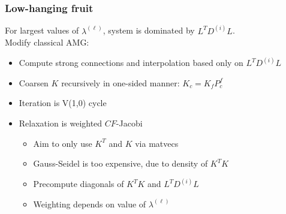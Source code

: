 \documentclass[12pt,t,xcolor=dvipsnames]{beamer}
\begin{document}
\begin{frame}
\frametitle{Low-hanging fruit}

For largest values of $\lambda^{(\ell)}$, system is dominated by
$L^TD^{(i)}L$. \\[12pt]

Modify classical AMG:
\begin{itemize}
\item Compute strong connections and interpolation based only on
  $L^TD^{(i)}L$
\item Coarsen $K$ recursively in one-sided manner: $K_c = K_fP^f_c$
\item Iteration is V(1,0) cycle
\item Relaxation is weighted $CF$-Jacobi
  \begin{itemize}
  \item Aim to only use $K^T$ and $K$ via matvecs
  \item Gauss-Seidel is too expensive, due to density of $K^TK$
  \item Precompute diagonals of $K^TK$ and $L^TD^{(i)}L$
  \item Weighting depends on value of $\lambda^{(\ell)}$
  \end{itemize}
  
\end{itemize}

\end{frame}
\end{document}
